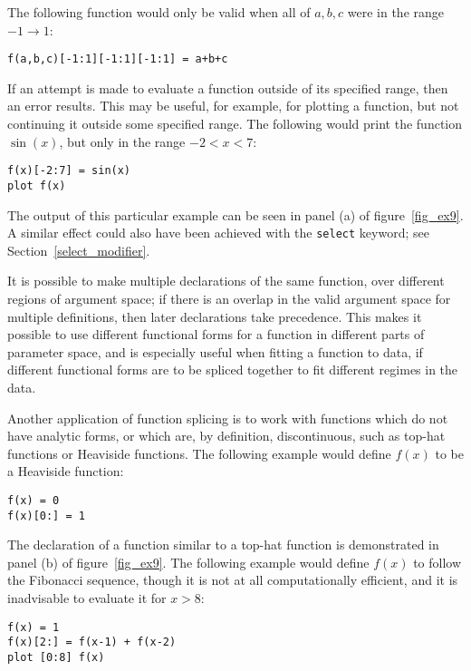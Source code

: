 \documentclass[a4paper,onecolumn,11pt]{book}
\begin{document}
\noindent The following function would only be valid when all of ${a,b,c}$ were
in the range $-1 \to 1$:

\begin{verbatim}
f(a,b,c)[-1:1][-1:1][-1:1] = a+b+c
\end{verbatim}

If an attempt is made to evaluate a function outside of its specified range,
then an error results. This may be useful, for example, for plotting a
function, but not continuing it outside some specified range. The following
would print the function $\sin(x)$, but only in the range $-2<x<7$:

\begin{verbatim}
f(x)[-2:7] = sin(x)
plot f(x)
\end{verbatim}

\label{splice} \noindent The output of this particular example can be seen in
panel (a) of figure~\ref{fig_ex9}. A similar effect could also have been
achieved with the \texttt{select} keyword; see Section~\ref{select_modifier}.

It is possible to make multiple declarations of the same function, over
different regions of argument space; if there is an overlap in the valid
argument space for multiple definitions, then later declarations take
precedence. This makes it possible to use different functional forms for a
function in different parts of parameter space, and is especially useful when
fitting a function to data, if different functional forms are to be spliced
together to fit different regimes in the data.

Another application of function splicing is to work with functions which do not
have analytic forms, or which are, by definition, discontinuous, such as
top-hat functions or Heaviside functions. The following example would define
$f(x)$ to be a Heaviside function:

\begin{verbatim}
f(x) = 0
f(x)[0:] = 1
\end{verbatim}

\noindent The declaration of a function similar to a top-hat function is
demonstrated in panel (b) of figure~\ref{fig_ex9}. The following example would
define $f(x)$ to follow the Fibonacci sequence, though it is not at all
computationally efficient, and it is inadvisable to evaluate it for $x>8$:

\begin{verbatim}
f(x) = 1
f(x)[2:] = f(x-1) + f(x-2)
plot [0:8] f(x)
\end{verbatim}
\end{document}
